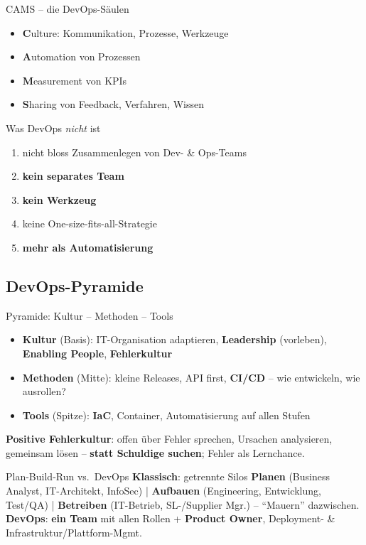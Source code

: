 \documentclass[a4paper, fontsize=7pt]{scrartcl}
\begin{document}
\begin{mainbox}{CAMS -- die DevOps-Säulen}
\begin{itemize}
    \item \textbf{C}ulture: Kommunikation, Prozesse, Werkzeuge
    \item \textbf{A}utomation von Prozessen
    \item \textbf{M}easurement von KPIs
    \item \textbf{S}haring von Feedback, Verfahren, Wissen
\end{itemize}
\end{mainbox}

\begin{mainbox}{Was DevOps \emph{nicht} ist}
\begin{enumerate}
    \item nicht bloss Zusammenlegen von Dev- \& Ops-Teams
    \item \textbf{kein separates Team}
    \item \textbf{kein Werkzeug}
    \item keine One-size-fits-all-Strategie
    \item \textbf{mehr als Automatisierung}
\end{enumerate}
\end{mainbox}

\subsection{DevOps-Pyramide}

\begin{mainbox}{Pyramide: Kultur -- Methoden -- Tools}
\begin{itemize}
    \item \textbf{Kultur} (Basis): IT-Organisation adaptieren,
          \textbf{Leadership} (vorleben), \textbf{Enabling People},
          \textbf{Fehlerkultur}
    \item \textbf{Methoden} (Mitte): kleine Releases, API first,
          \textbf{CI/CD} -- wie entwickeln, wie ausrollen?
    \item \textbf{Tools} (Spitze): \textbf{IaC}, Container,
          Automatisierung auf allen Stufen
\end{itemize}
\textbf{Positive Fehlerkultur}: offen über Fehler sprechen, Ursachen
analysieren, gemeinsam lösen -- \textbf{statt Schuldige suchen}; Fehler als
Lernchance.
\end{mainbox}

\begin{subbox}{Plan-Build-Run vs.\ DevOps}
\textbf{Klassisch}: getrennte Silos \textbf{Planen} (Business Analyst,
IT-Architekt, InfoSec) | \textbf{Aufbauen} (Engineering, Entwicklung,
Test/QA) | \textbf{Betreiben} (IT-Betrieb, SL-/Supplier Mgr.) -- ``Mauern''
dazwischen.\\
\textbf{DevOps}: \textbf{ein Team} mit allen Rollen + \textbf{Product
Owner}, Deployment- \& Infrastruktur/Plattform-Mgmt.
\end{subbox}
\end{document}

